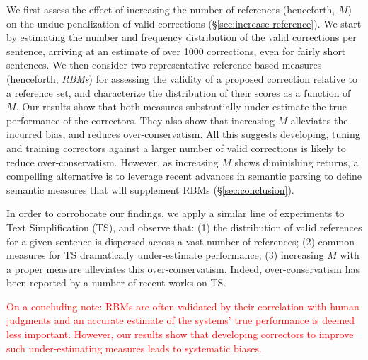 \documentclass[letterpaper, 11pt]{article}
\begin{document}
We first assess the effect of increasing the number of references (henceforth, $M$) on 
the undue penalization of valid corrections (\S \ref{sec:increase-reference}).
We start by estimating the number and frequency distribution of the valid corrections per sentence, arriving 
at an estimate of over 1000 corrections, even for fairly short sentences.
We then consider two representative reference-based measures (henceforth, {\it RBMs}) for
assessing the validity of a proposed correction relative to a reference set, 
and characterize the distribution of their scores as a function of $M$. 
Our results show that both measures substantially under-estimate the true performance of
the correctors. They also show that increasing $M$ alleviates the incurred bias, 
and reduces over-conservatism. All this suggests developing, tuning and training correctors against a larger number of valid corrections is likely to reduce over-conservatism.
However, as increasing $M$ shows diminishing returns, a compelling alternative
is to leverage recent advances in semantic parsing to define semantic
measures that will supplement RBMs (\S\ref{sec:conclusion}). 

In order to corroborate our findings, we apply a 
similar line of experiments to Text Simplification (TS),
and observe that: (1) the distribution of valid references for a given sentence is dispersed across a vast number of references; 
(2) common measures for TS dramatically under-estimate performance; 
(3) increasing $M$ with a proper measure alleviates this over-conservatism.
Indeed, over-conservatism has been reported by a number of recent works on TS.%

\textcolor{red}{
On a concluding note: RBMs are often validated by their correlation with human judgments and an accurate estimate of the systems' true performance is deemed less important. However, our results show that developing correctors to improve such under-estimating measures leads to systematic biases.}
\end{document}

